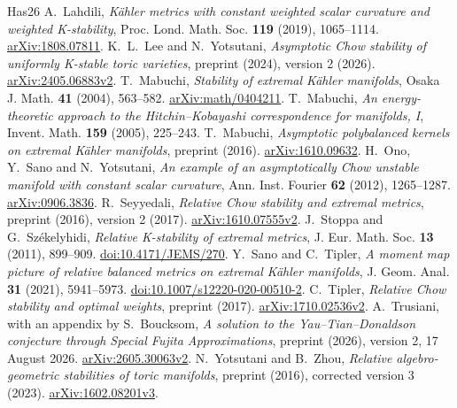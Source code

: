 \documentclass[12pt]{amsart}
\theoremstyle{definition}
\theoremstyle{remark}
\numberwithin{equation}{section}
\begin{document}
\begin{thebibliography}{Has26}
A.~Lahdili,
\emph{Kähler metrics with constant weighted scalar curvature and weighted K-stability},
Proc. Lond. Math. Soc. \textbf{119} (2019), 1065--1114.
\href{https://arxiv.org/abs/1808.07811}{arXiv:1808.07811}.
K.~L.~Lee and N.~Yotsutani,
\emph{Asymptotic Chow stability of uniformly K-stable toric varieties},
preprint (2024), version 2 (2026).
\href{https://arxiv.org/abs/2405.06883v2}{arXiv:2405.06883v2}.
T.~Mabuchi,
\emph{Stability of extremal Kähler manifolds},
Osaka J. Math. \textbf{41} (2004), 563--582.
\href{https://arxiv.org/abs/math/0404211}{arXiv:math/0404211}.
T.~Mabuchi,
\emph{An energy-theoretic approach to the Hitchin--Kobayashi correspondence for manifolds, I},
Invent. Math. \textbf{159} (2005), 225--243.
T.~Mabuchi,
\emph{Asymptotic polybalanced kernels on extremal Kähler manifolds},
preprint (2016).
\href{https://arxiv.org/abs/1610.09632}{arXiv:1610.09632}.
H.~Ono, Y.~Sano and N.~Yotsutani,
\emph{An example of an asymptotically Chow unstable manifold with constant scalar curvature},
Ann. Inst. Fourier \textbf{62} (2012), 1265--1287.
\href{https://arxiv.org/abs/0906.3836}{arXiv:0906.3836}.
R.~Seyyedali,
\emph{Relative Chow stability and extremal metrics},
preprint (2016), version 2 (2017).
\href{https://arxiv.org/abs/1610.07555v2}{arXiv:1610.07555v2}.
J.~Stoppa and G.~Székelyhidi,
\emph{Relative K-stability of extremal metrics},
J. Eur. Math. Soc. \textbf{13} (2011), 899--909.
\href{https://doi.org/10.4171/JEMS/270}{doi:10.4171/JEMS/270}.
Y.~Sano and C.~Tipler,
\emph{A moment map picture of relative balanced metrics on extremal Kähler manifolds},
J. Geom. Anal. \textbf{31} (2021), 5941--5973.
\href{https://doi.org/10.1007/s12220-020-00510-2}{doi:10.1007/s12220-020-00510-2}.
C.~Tipler,
\emph{Relative Chow stability and optimal weights},
preprint (2017).
\href{https://arxiv.org/abs/1710.02536v2}{arXiv:1710.02536v2}.
A.~Trusiani, with an appendix by S.~Boucksom,
\emph{A solution to the Yau--Tian--Donaldson conjecture through Special Fujita Approximations},
preprint (2026), version 2, 17 August 2026.
\href{https://arxiv.org/abs/2605.30063v2}{arXiv:2605.30063v2}.
N.~Yotsutani and B.~Zhou,
\emph{Relative algebro-geometric stabilities of toric manifolds},
preprint (2016), corrected version 3 (2023).
\href{https://arxiv.org/abs/1602.08201v3}{arXiv:1602.08201v3}.
\end{thebibliography}
\end{document}
